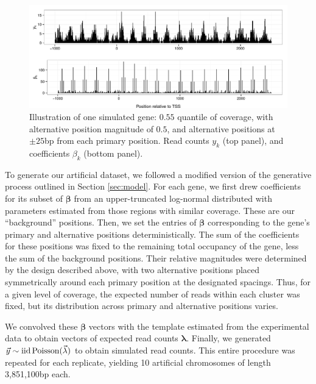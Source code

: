 \ifx\nofigures\undefined
\begin{figure}
\begin{center}
\includegraphics[width=\textwidth]{figures/nucleosomes/plot_repGene_combined}
\caption{Illustration of one simulated gene: $0.55$ quantile of coverage, with alternative position magnitude of $0.5$, and alternative positions at $\pm 25$bp from each primary position. Read counts $y_k$ (top panel), and coefficients $\beta_k$ (bottom panel). \label{fig:repgene}}
\end{center}
\end{figure}
\fi

To generate our artificial dataset, we followed a modified version of the generative process outlined in Section \ref{sec:model}.
For each gene, we first drew coefficients for its subset of $\bm \beta$ from an upper-truncated log-normal distributed with parameters estimated from those regions with similar coverage.
These are our ``background'' positions.
Then, we set the entries of $\bm \beta$ corresponding to the gene's primary and alternative positions deterministically.
The sum of the coefficients for these positions was fixed to the remaining total occupancy of the gene, less the sum of the background positions.
Their relative magnitudes were determined by the design described above, with two alternative positions placed symmetrically around each primary position at the designated spacings.
Thus, for a given level of coverage, the expected number of reads within each cluster was fixed, but its distribution across primary and alternative positions varies.

We convolved these $\bm \beta$ vectors with the template estimated from the experimental data to obtain vectors of expected read counts $\bm \lambda$.
Finally, we generated $\vec y \sim \mathrm{iid} \operatorname{Poisson}(\vec \lambda)$ to obtain simulated read counts.
This entire procedure was repeated for each replicate, yielding 10 artificial chromosomes of length 3,851,100bp each.

